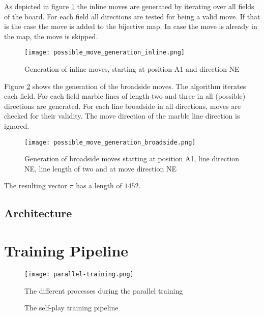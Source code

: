 \begin{enumerate}
          As depicted in figure \ref{possible_move_generation_inline} the inline moves are generated by iterating over all fields of the board. For each field all directions are tested for being a valid move. If that is the case the move is added to the bijective map. In case the move is already in the map, the move is skipped.

          \begin{figure}
              \centering
              \texttt{[image: possible\_move\_generation\_inline.png]}
              \caption{Generation of inline moves, starting at position A1 and direction NE}
              \label{possible_move_generation_inline}
          \end{figure}

          Figure \ref{possible_move_generation_broadside} shows the generation of the broadside moves. The algorithm iterates each field. For each field marble lines of length two and three in all (possible) directions are generated. For each line broadside in all directions, moves are checked for their validity. The move direction of the marble line direction is ignored.

          \begin{figure}
              \centering
              \texttt{[image: possible\_move\_generation\_broadside.png]}
              \caption{Generation of broadside moves starting at position A1, line direction NE, line length of two and at move direction NE}
              \label{possible_move_generation_broadside}
          \end{figure}

          The resulting vector $\pi$ has a length of $1452$.
\end{enumerate}

\subsection{Architecture}

\section{Training Pipeline}
\begin{figure}
    \centering
    \texttt{[image: parallel-training.png]}
    \caption{The different processes during the parallel training}
    \label{parallel_training_pipeline}
\end{figure}

\begin{figure}[!h]
    \centering
    \caption{The self-play training pipeline}
    \label{training_algorithm}
\end{figure}
